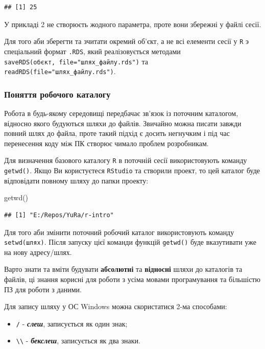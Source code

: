 \documentclass[
]{book}
\newenvironment{Shaded}{\begin{snugshade}}{\end{snugshade}}
\newcommand{\FunctionTok}[1]{\textcolor[rgb]{0.00,0.00,0.00}{#1}}
\newcommand{\NormalTok}[1]{#1}
\providecommand{\tightlist}{%
  \setlength{\itemsep}{0pt}\setlength{\parskip}{0pt}}
\begin{document}
\begin{verbatim}
## [1] 25
\end{verbatim}

У прикладі 2 не створюєть жодного параметра, проте вони збережні у файлі сесії.

Для того аби зберегти та зчитати окремий об'єкт, а не всі елементи сесії у \texttt{R} э спеціальний формат \texttt{.RDS}, який реалізовується методами \texttt{saveRDS(об\textquotesingle{}єкт,\ file="шлях\_файлу.rds")} та \texttt{readRDS(file="шлях\_файлу.rds")}.

\hypertarget{chapter1314}{%
\subsubsection{Поняття робочого каталогу}\label{chapter1314}}

Робота в будь-якому середовищі передбачає зв'язок із поточним каталогом, відносно якого будуються шляхи до файлів. Звичайно можна писати завжди повний шлях до файла, проте такий підхід є досить негнучким і під час перенесення коду між ПК створює чимало проблем розробникам.

Для визначення базового каталогу \texttt{R} в поточній сесії використовують команду \texttt{getwd()}. Якщо Ви користуєтеся \texttt{RStudio} та створили проект, то цей каталог буде відповідати повному шляху до папки проекту:

\begin{Shaded}
\begin{Highlighting}[]
\FunctionTok{getwd}\NormalTok{()}
\end{Highlighting}
\end{Shaded}

\begin{verbatim}
## [1] "E:/Repos/YuRa/r-intro"
\end{verbatim}

Для того аби змінити поточний робочий каталог використовують команду \texttt{setwd(шлях)}. Після запуску цієї команди функцій \texttt{getwd()} буде вказутивати уже на нову адресу/шлях.

Варто знати та вміти будувати \textbf{абсолютні} та \textbf{відносні} шляхи до каталогів та файлів, ці знання корисні для роботи з усіма мовами програмування та більшістю ПЗ для роботи з даними.

Для запису шляху у ОС Windows можна скористатися 2-ма способами:

\begin{itemize}
\tightlist
\item
  \texttt{/} - \textbf{\emph{слеш}}, записується як один знак;
\item
  \texttt{\textbackslash{}\textbackslash{}} - \textbf{\emph{бекслеш}}, записується як два знаки.
\end{itemize}
\end{document}
